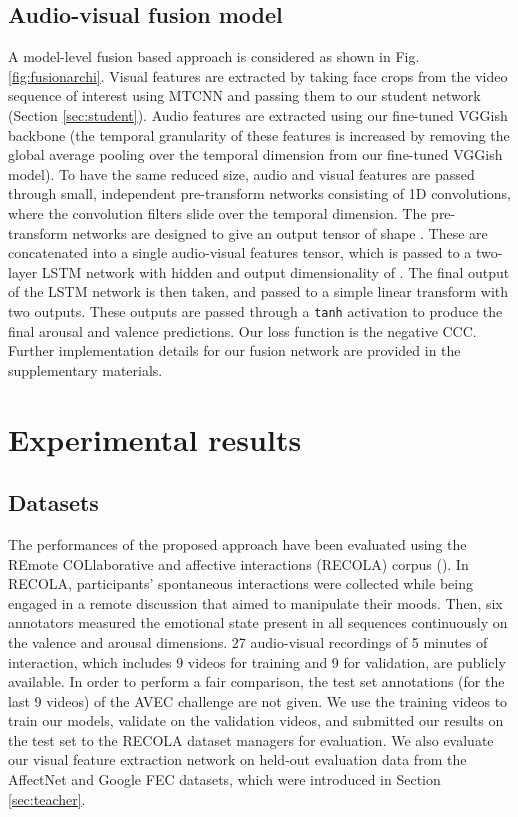 \documentclass[times,twocolumn,final,authoryear]{elsarticle}
\begin{document}
	\subsection{Audio-visual fusion model}
	\label{sec:fusion}
	
	A model-level fusion based approach is considered as shown in Fig. \ref{fig:fusionarchi}. Visual features are extracted by taking face crops from the video sequence of interest using MTCNN and passing them to our student network (Section \ref{sec:student}). Audio features are extracted using our fine-tuned VGGish backbone (the temporal granularity of these features is increased by removing the global average pooling over the temporal dimension from our fine-tuned VGGish model). To have the same reduced size, audio and visual features are passed through small, independent pre-transform networks consisting of 1D convolutions, where the convolution filters slide over the temporal dimension. The pre-transform networks are designed to give an output tensor of shape . These are concatenated into a single audio-visual features tensor, which is passed to a two-layer LSTM network with hidden and output dimensionality of . The final output of the LSTM network is then taken, and passed to a simple linear transform with two outputs. These outputs are passed through a \texttt{tanh} activation to produce the final arousal and valence predictions. Our loss function is the negative CCC. Further implementation details for our fusion network are provided in the supplementary materials.
	
	\section{Experimental results}
	\label{sec:results}
	
	\subsection{Datasets}
	\label{sec:datasets}
	The performances of the proposed approach have been evaluated using the REmote COLlaborative and affective interactions (RECOLA) corpus (\cite{recola}). In RECOLA, participants' spontaneous interactions were collected while being engaged in a remote discussion that aimed to manipulate their moods. Then, six annotators measured the emotional state present in all sequences continuously on the valence and arousal dimensions. 27 audio-visual recordings of 5 minutes of interaction, which includes 9 videos for training and 9 for validation, are publicly available. In order to perform a fair comparison, the test set annotations (for the last 9 videos) of the AVEC challenge are not given. We use the training videos to train our models, validate on the validation videos, and submitted our results on the test set to the RECOLA dataset managers for evaluation. We also evaluate our visual feature extraction network on held-out evaluation data from the AffectNet and Google FEC datasets, which were introduced in Section \ref{sec:teacher}.
	
\end{document}
